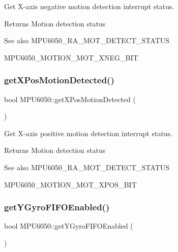 Get X-\/axis negative motion detection interrupt status. \begin{DoxyReturn}{Returns}
Motion detection status 
\end{DoxyReturn}
\begin{DoxySeeAlso}{See also}
M\+P\+U6050\+\_\+\+R\+A\+\_\+\+M\+O\+T\+\_\+\+D\+E\+T\+E\+C\+T\+\_\+\+S\+T\+A\+T\+US 

M\+P\+U6050\+\_\+\+M\+O\+T\+I\+O\+N\+\_\+\+M\+O\+T\+\_\+\+X\+N\+E\+G\+\_\+\+B\+IT 
\end{DoxySeeAlso}
\mbox{\label{class_m_p_u6050_a410af58f5ff5f74e4ef8d61495908226}} 
\subsubsection{\texorpdfstring{getXPosMotionDetected()}{getXPosMotionDetected()}}
{\footnotesize\ttfamily bool M\+P\+U6050\+::get\+X\+Pos\+Motion\+Detected (\begin{DoxyParamCaption}{ }\end{DoxyParamCaption})}

Get X-\/axis positive motion detection interrupt status. \begin{DoxyReturn}{Returns}
Motion detection status 
\end{DoxyReturn}
\begin{DoxySeeAlso}{See also}
M\+P\+U6050\+\_\+\+R\+A\+\_\+\+M\+O\+T\+\_\+\+D\+E\+T\+E\+C\+T\+\_\+\+S\+T\+A\+T\+US 

M\+P\+U6050\+\_\+\+M\+O\+T\+I\+O\+N\+\_\+\+M\+O\+T\+\_\+\+X\+P\+O\+S\+\_\+\+B\+IT 
\end{DoxySeeAlso}
\mbox{\label{class_m_p_u6050_a86c85d5b5c93df82394435b868e17463}} 
\subsubsection{\texorpdfstring{getYGyroFIFOEnabled()}{getYGyroFIFOEnabled()}}
{\footnotesize\ttfamily bool M\+P\+U6050\+::get\+Y\+Gyro\+F\+I\+F\+O\+Enabled (\begin{DoxyParamCaption}{ }\end{DoxyParamCaption})}

